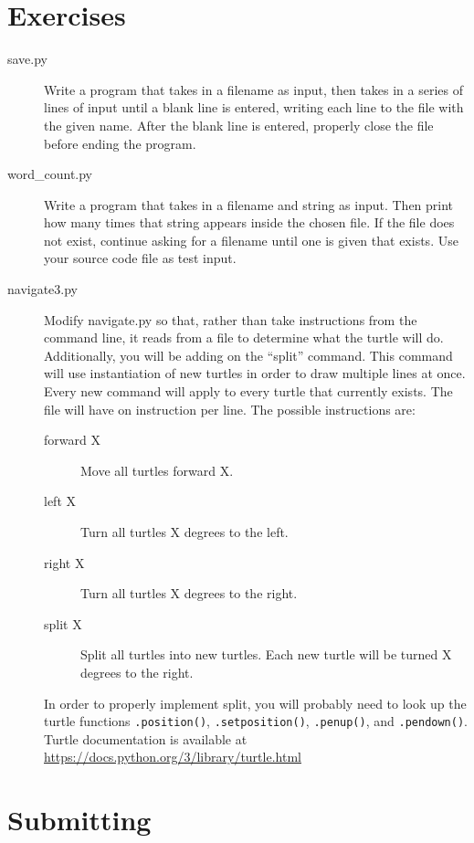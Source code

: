 \documentclass[11pt]{cselabheader}
\begin{document}
\section{Exercises}
\label{sec:ex}

\begin{description}
\item[save.py] Write a program that takes in a filename as input, then takes in a series of lines of input until a blank line is entered, writing each line to the file with the given name. After the blank line is entered, properly close the file before ending the program.
\item[word\_count.py] Write a program that takes in a filename and string as input. Then print how many times that string appears inside the chosen file. If the file does not exist, continue asking for a filename until one is given that exists. Use your source code file as test input.
\item[navigate3.py] Modify navigate.py so that, rather than take instructions from the command line, it reads from a file to determine what the turtle will do. Additionally, you will be adding on the ``split'' command. This command will use instantiation of new turtles in order to draw multiple lines at once. Every new command will apply to every turtle that currently exists. The file will have on instruction per line. The possible instructions are:

  \begin{description}
    \item[forward X] Move all turtles forward X.
    \item[left X] Turn all turtles X degrees to the left.
    \item[right X] Turn all turtles X degrees to the right.
    \item[split X] Split all turtles into new turtles. Each new turtle will be turned X degrees to the right.
  \end{description}

  In order to properly implement split, you will probably need to look up the turtle functions \lstinline{.position()}, \lstinline{.setposition()}, \lstinline{.penup()}, and \lstinline{.pendown()}. Turtle documentation is available at \url{https://docs.python.org/3/library/turtle.html}

\end{description}

\section{Submitting}
\end{document}
